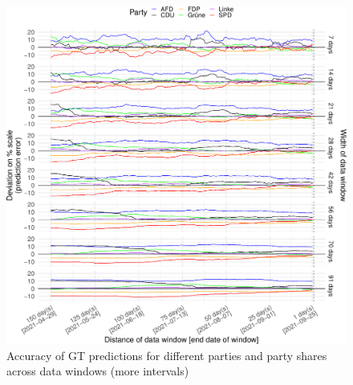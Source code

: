 \documentclass[
  letterpaper,
  DIV=11,
  numbers=noendperiod]{scrartcl}
\begin{document}
\begin{figure}[H]

\caption{\label{fig-A4}Accuracy of GT predictions for different parties
and party shares across data windows (more intervals)}

{\centering \includegraphics{figures/fig-A4-1.pdf}

}

\end{figure}
\end{document}
